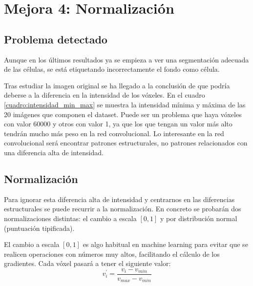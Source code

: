 \chapter{Mejora 4: Normalización}\label{znormalization}

\section{Problema detectado}\label{sec:znormalization_problem}

Aunque en los últimos resultados ya se empieza a ver una segmentación adecuada de las células, se está etiquetando incorrectamente el fondo como célula.

Tras estudiar la imagen original se ha llegado a la conclusión de que podría deberse a la diferencia en la intensidad de los vóxeles. En el cuadro \ref{cuadro:intensidad_min_max} se muestra la intensidad mínima y máxima de las 20 imágenes que componen el dataset. Puede ser un problema que haya vóxeles con valor 60000 y otros con valor 1, ya que los que tengan un valor más alto tendrán mucho más peso en la red convolucional. Lo interesante en la red convolucional será encontrar patrones estructurales, no patrones relacionados con una diferencia alta de intensidad.


\section{Normalización}\label{sec:normalization_techs}

Para ignorar esta diferencia alta de intensidad y centrarnos en las diferencias estructurales se puede recurrir a la normalización. En concreto se probarán dos normalizaciones distintas: el cambio a escala $[0,1]$ y por distribución normal (puntuación tipificada).

El cambio a escala $[0,1]$ es algo habitual en machine learning para evitar que se realicen operaciones con números muy altos, facilitando el cálculo de los gradientes. Cada vóxel pasará a tener el siguiente valor:
\begin{equation}
v_i^{'} = \frac{v_i - v_{min}}{v_{max}-v_{min}}
\end{equation}

